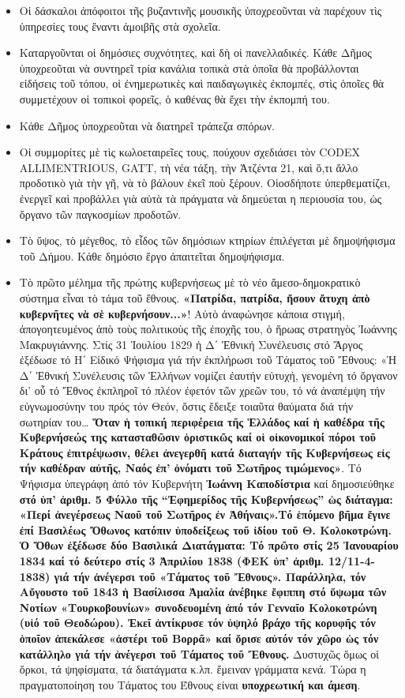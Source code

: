 \documentclass[a4paper]{article}
\begin{document}
\begin{itemize}
\item Οἱ δάσκαλοι ἀπόφοιτοι τῆς βυζαντινῆς μουσικῆς ὑποχρεοῦνται νὰ παρέχουν τὶς ὑπηρεσίες τους ἔναντι ἀμοιβῆς στὰ σχολεῖα.
\item Καταργοῦνται οἱ δημόσιες συχνότητες, καὶ δὴ οἱ πανελλαδικές. Κάθε Δῆμος ὑποχρεοῦται νὰ συντηρεῖ τρία κανάλια τοπικὰ στὰ ὁποῖα θὰ προβάλλονται εἰδήσεις τοῦ τόπου, οἱ ἐνημερωτικὲς καὶ παιδαγωγικὲς ἐκπομπές, στὶς ὁποῖες θὰ συμμετέχουν οἱ τοπικοὶ φορεῖς, ὁ καθένας θὰ ἔχει τὴν ἐκπομπή του.
\item Κάθε Δῆμος ὑποχρεοῦται νὰ διατηρεῖ τράπεζα σπόρων.
\item Οἱ συμμορίτες μὲ τὶς κωλοεταιρεῖες τους, πούχουν σχεδιάσει τὸν CODEX ALLIMENTRIOUS, GATT, τὴ νέα τάξη, τὴν Ἀτζέντα 21, καὶ ὅ,τι ἄλλο προδοτικὸ γιὰ τὴν γῆ, νὰ τὸ βάλουν ἐκεῖ ποὺ ξέρουν. Οἱοσδήποτε ὑπερθεματίζει, ἐνεργεῖ καὶ προβάλλει γιὰ αὐτὰ τὰ πράγματα νὰ δημεύεται η περιουσία του, ὡς ὄργανο τῶν παγκοσμίων προδοτῶν.
\item Τὸ ὕψος, τὸ μέγεθος, τὸ εἶδος τῶν δημόσιων κτηρίων ἐπιλέγεται μὲ δημοψήφισμα τοῦ Δήμου. Κάθε δημόσιο ἔργο ἀπαιτεῖται δημοψήφισμα.
\item Τὸ πρῶτο μέλημα τῆς πρώτης κυβερνήσεως μὲ τὸ νέο ἄμεσο-δημοκρατικὸ σύστημα εἶναι τὸ τάμα τοῦ ἔθνους. \textbf{«Πατρίδα, πατρίδα, ἤσουν ἄτυχη ἀπὸ κυβερνῆτες νὰ σὲ κυβερνήσουν...»}! Αὐτὸ ἀναφώνησε κάποια στιγμή, ἀπογοητευμένος ἀπὸ τοὺς πολιτικοὺς τῆς ἐποχῆς του, ὁ ἥρωας στρατηγὸς Ἰωάννης Μακρυγιάννης. Στίς 31 Ἰουλίου 1829 ἡ Δ΄ Ἐθνική Συνέλευσις στό Ἄργος ἐξέδωσε τό Η΄ Εἰδικό Ψήφισμα γιά τήν ἐκπλήρωσι τοῦ Τάματος τοῦ Ἔθνους: «Ἡ Δ΄ Ἐθνική Συνέλευσις τῶν Ἑλλήνων νομίζει ἐαυτήν εὐτυχή, γενομένη τό ὄργανον δι’ οὖ τό Ἔθνος ἐκπληροῖ τό πλέον ἐφετόν τῶν χρεῶν του, τό νά ἀναπέμψη τήν εὐγνωμοσύνην του πρός τόν Θεόν, ὅστις ἔδειξε τοιαῦτα θαύματα διά τήν σωτηρίαν του… \textbf{Ὅταν ἡ τοπική περιφέρεια τῆς Ἑλλάδος καί ἡ καθέδρα τῆς Κυβερνήσεώς της κατασταθῶσιν ὁριστικῶς καί οἱ οἰκονομικοί πόροι τοῦ Κράτους ἐπιτρέψωσιν, θέλει ἀνεγερθῆ κατά διαταγήν τῆς Κυβερνήσεως εἰς τήν καθέδραν αὐτῆς, Ναός ἐπ’ ὀνόματι τοῦ Σωτῆρος τιμώμενος»}. Τό Ψήφισμα ὑπεγράφη ἀπό τόν Κυβερνήτη \textbf{Ἰωάννη Καποδίστρια} καί δημοσιεύθηκε \textbf{στό ὑπ’ ἀριθμ. 5 Φύλλο τῆς “Ἐφημερίδος τῆς Κυβερνήσεως” ὡς διάταγμα: «Περί ἀνεγέρσεως Ναοῦ τοῦ Σωτῆρος ἐν Ἀθήναις».Τό ἑπόμενο βῆμα ἔγινε ἐπί Βασιλέως Ὄθωνος κατόπιν ὑποδείξεως τοῦ ἰδίου τοῦ Θ. Κολοκοτρώνη. Ὁ Ὄθων ἐξέδωσε δύο Βασιλικά Διατάγματα: Τό πρῶτο στίς 25 Ἰανουαρίου 1834 καί τό δεύτερο στίς 3 Ἀπριλίου 1838 (ΦΕΚ ὑπ’ ἀριθμ. 12/11-4-1838) γιά τήν ἀνέγερσι τοῦ «Τάματος τοῦ Ἔθνους». Παράλληλα, τόν Αὔγουστο τοῦ 1843 ἡ Βασίλισσα Ἀμαλία ἀνέβηκε ἔφιππη στό ὕψωμα τῶν Νοτίων «Τουρκοβουνίων» συνοδευομένη ἀπό τόν Γενναῖο Κολοκοτρώνη (υἱό τοῦ Θεοδώρου). Ἐκεῖ ἀντίκρυσε τόν ὑψηλό βράχο τῆς κορυφῆς τόν ὁποῖον ἀπεκάλεσε «ἀστέρι τοῦ Βορρᾶ» καί ὅρισε αὐτόν τόν χῶρο ὡς τόν κατάλληλο γιά τήν ἀνέγερσι τοῦ Τάματος τοῦ Ἔθνους.} Δυστυχῶς ὅμως οἱ ὅρκοι, τά ψηφίσματα, τά διατάγματα κ.λπ. ἔμειναν γράμματα κενά. Τώρα η πραγματοποίηση του Τάματος του Έθνους είναι \textbf{υποχρεωτική και άμεση}.

\end{itemize}
\end{document}
